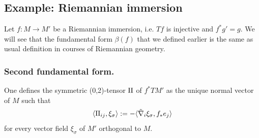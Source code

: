 \subsection{Example: Riemannian immersion}
\label{sec:orgdfd351c}
Let \(f: M \longrightarrow M'\) be a Riemannian immersion, i.e. \(Tf\) is injective and \(f^*g' = g\). We will
see that the fundamental form \(\beta(f)\) that we defined earlier is the same as usual definition in courses of Riemannian geometry.
\subsubsection{Second fundamental form.}
\label{sec:org41d77ed}
One defines the symmetric (0,2)-tensor \(\sff\) of \(f^*TM'\) as the unique normal vector of \(M\) such that
\[
\langle \sff_{ij},\xi_\sigma \rangle:= -\langle \tilde\nabla_i\xi_\sigma, f_* e_j\rangle
\]
for every vector field \(\xi_\sigma\) of \(M'\) orthogonal to \(M\).

